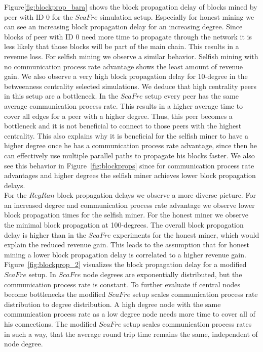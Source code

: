 Figure\ref{fig:blockprop_bara} shows the  block propagation delay of blocks mined by peer with ID $0$ for the $ScaFre$ simulation setup. Especially for honest mining we can see an increasing block propagation delay for an increasing degree. Since blocks of peer with ID $0$ need more time to propagate through the network it is less likely that those blocks will be part of the main chain. This results in a revenue loss. For selfish mining we observe a similar behavior. Selfish mining with no communication process rate advantage shows the least amount of revenue gain. We also observe a very high block propagation delay for 10-degree in the betweenness centrality selected simulations. We deduce that high centrality peers in this setup are a bottleneck. In the $ScaFre$ setup every peer has the same average communication process rate. This results in a higher average time to cover all edges for a peer with a higher degree. Thus, this peer becomes a bottleneck and it is not beneficial to connect to those peers with the highest centrality. This also explains why it is beneficial for the selfish miner to have a higher degree once he has a communication process rate advantage, since then he can effectively use multiple parallel paths to propagate his blocks faster. We also see this behavior in Figure~\ref{fig:blockprops} since for communication process rate advantages and higher degrees the selfish miner achieves lower block propagation delays.\\
For the $RegRan$ block propagation delays we observe a more diverse picture. For an increased degree and communication process rate advantage we observe lower block propagation times for the selfish miner. For the honest miner we observe the minimal block propagation at 100-degrees. The overall block propagation delay is higher than in the $ScaFre$ experiments for the honest miner, which would explain the reduced revenue gain. This leads to the assumption that for honest mining a lower block propagation delay is correlated to a higher revenue gain.\\
Figure~\ref{fig:blockprop_2} visualizes the block propagation delay for a modified $ScaFre$ setup. In $ScaFre$ node degrees are exponentially distributed, but the communication process rate is constant. To further evaluate if central nodes become bottlenecks the modified $ScaFre$ setup scales communication process rate distribution to degree distribution. A high degree node with the same communication process rate as a low degree node needs more time to cover all of his connections. The modified $ScaFre$ setup scales communication process rates in such a way, that the average round trip time remains the same, independent of node degree.
